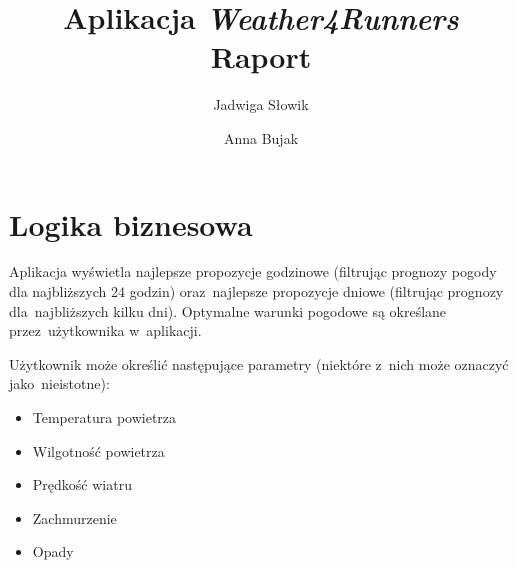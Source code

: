 \documentclass[11pt, a4paper, oneside]{scrartcl}
\author{Jadwiga Słowik \and Anna Bujak}
\title{Aplikacja \textit{Weather4Runners} \\ Raport}
\begin{document}
\maketitle

\section{Logika biznesowa}
Aplikacja wyświetla najlepsze propozycje godzinowe (filtrując prognozy pogody dla najbliższych $24$ godzin) oraz~najlepsze propozycje dniowe
(filtrując prognozy dla~najbliższych kilku dni). Optymalne warunki pogodowe są określane przez~użytkownika w~aplikacji.

Użytkownik może określić następujące parametry (niektóre z~nich może oznaczyć jako~nieistotne):
\begin{itemize}
	\item Temperatura powietrza
	\item Wilgotność powietrza
	\item Prędkość wiatru
	\item Zachmurzenie
	\item Opady
\end{itemize} 
\end{document}
